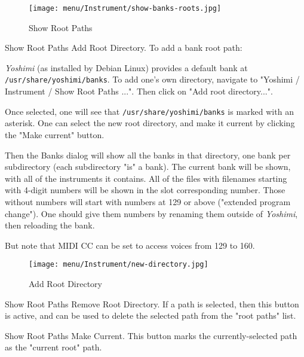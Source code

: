 \begin{figure}[H]
   \centering 
   \texttt{[image: menu/Instrument/show-banks-roots.jpg]}
   \caption[Show Root Paths]{Show Root Paths}
   \label{fig:show_banks_roots}
\end{figure}

   \setcounter{ItemCounter}{0}      %

   Show Root Paths Add Root Directory.
   To add a bank root path:

   \textsl{Yoshimi} (as installed by Debian Linux) provides a default bank at
   \texttt{/usr/share/yoshimi/banks}.
   To add one's own directory, navigate to "Yoshimi / Instrument / Show Root
   Paths ...".  Then click on "Add root directory...".

   Once selected, one will see that \texttt{/usr/share/yoshimi/banks}
   is marked with an asterisk.  One can select the new root directory,
   and make it current by clicking the "Make current" button.

   Then the Banks dialog will show all the banks in that directory, one bank
   per subdirectory (each subdirectory "is" a bank).  The current bank will
   be shown, with all of the instruments it contains.  All of the files with
   filenames starting with 4-digit numbers will be shown in the slot
   corresponding number.  Those without numbers will start with numbers at
   129 or above ("extended program change").  One should
   give them numbers by renaming them outside of \textsl{Yoshimi},
   then reloading the bank.

   But note that MIDI CC can be set to access voices from 129 to 160.

\begin{figure}[H]
   \centering 
   \texttt{[image: menu/Instrument/new-directory.jpg]}
   \caption{Add Root Directory}
   \label{fig:add_root_directory}
\end{figure}

   Show Root Paths Remove Root Directory.
   If a path is selected, then this button is active, and can be used to
   delete the selected path from the "root paths" list.

   Show Root Paths Make Current.
   This button marks the currently-selected path as the "current root" path.


